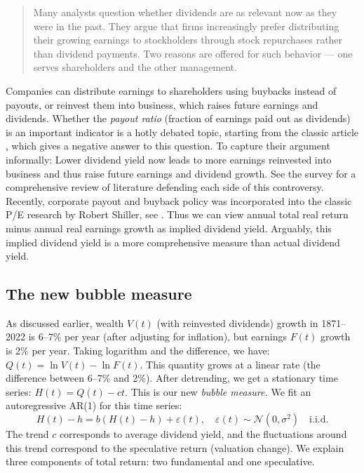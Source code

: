 \documentclass[12pt]{amsart}
\theoremstyle{definition}
\begin{document}
\begin{quote}
Many analysts question whether dividends are as relevant now as they were in the past. They argue that firms increasingly prefer distributing their growing earnings to stockholders through stock repurchases rather than dividend payments. Two reasons are offered for such behavior --- one serves shareholders and the other management.
\end{quote}

Companies can distribute earnings to shareholders using buybacks instead of payouts, or reinvest them into business, which raises future earnings and dividends. Whether the {\it payout ratio} (fraction of earnings paid out as dividends) is an important indicator is a hotly debated topic, starting from the classic article \cite{MM61}, which gives a negative answer to this question. To capture their argument informally: Lower dividend yield now leads to more earnings reinvested into business and thus raise future earnings and dividend growth. See the survey \cite{DividendSurvey} for a comprehensive review of literature defending each side of this controversy. Recently, corporate payout and buyback policy was incorporated into the classic P/E research by Robert Shiller, see  \cite{Bunn, Farouk}. Thus we can view annual total real return minus annual real earnings growth as implied dividend yield. Arguably, this implied dividend yield is a more comprehensive measure than actual dividend yield. 

\subsection{The new bubble measure} As discussed earlier, wealth $V(t)$ (with reinvested dividends) growth in 1871--2022 is 6--7\% per year (after adjusting for inflation), but earnings $F(t)$ growth is 2\% per year. Taking logarithm and the difference, we have: $Q(t) = \ln V(t) - \ln F(t)$. This quantity grows at a linear rate (the difference between 6--7\% and 2\%). After detrending, we get a stationary time series: $H(t) = Q(t) - ct$. This is our new {\it bubble  measure.} We fit an autoregressive AR(1) for this time series:
$$
H(t) - h = b(H(t) - h) + \varepsilon(t),\quad \varepsilon(t) \sim \mathcal N(0, \sigma^2)\quad \mbox{i.i.d.} 
$$
The trend $c$ corresponds to average dividend yield, and the fluctuations around this trend correspond to the speculative return (valuation change). We explain three components of total return: two fundamental and one speculative. 
\end{document}
